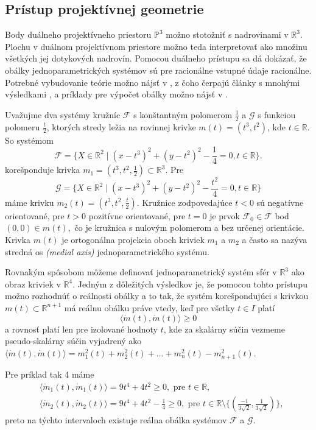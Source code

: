 \subsection{Prístup projektívnej geometrie}
Body duálneho projektívneho priestoru $\mathbb{P}^3 $ možno stotožniť s nadrovinami v $\mathbb{R}^3$. Plochu v duálnom projektívnom priestore možno teda interpretovať ako množinu všetkých jej dotykových nadrovín. Pomocou duálneho prístupu sa dá dokázať, že obálky jednoparametrických systémov sú pre racionálne vstupné údaje racionálne. Potrebné vybudovanie teórie možno nájsť v \cite{Pott01}, z čoho čerpajú články s mnohými výsledkami \cite{Pet08}, \cite{Pet98} a príklady pre výpočet obálky možno nájsť v \cite{Vra22}.
\begin{example}
Uvažujme dva systémy kružníc $\mathcal{F}$ s konštantným polomerom $\frac{1}{2}$ a $\mathcal{G}$ s funkciou polomeru $\frac{t}{2}$, ktorých stredy ležia na rovinnej krivke $m(t) = (t^3, t^2)$, kde $t \in \mathbb{R}.$
So systémom
$$ \mathcal{F} = \{ X \in \mathbb{R}^2 \mid (x - t^3)^2 + (y - t^2)^2 - \frac{1}{4} = 0, t \in \mathbb{R} \}.$$
korešponduje krivka $m_1 = (t^3, t^2, \frac{1}{2})\subset \mathbb{R}^3$.
Pre
$$ \mathcal{G} = \{ X \in \mathbb{R}^2 \mid (x - t^3)^2 + (y - t^2)^2 - \frac{t^2}{4} = 0, t \in \mathbb{R} \}$$
máme krivku $m_2(t) = (t^3, t^2, \frac{t}{2}).$
Kružnice zodpovedajúce $t < 0$ sú negatívne orientované, pre $t > 0$ pozitívne orientované, pre $t = 0$ je prvok $\mathcal{F}_0 \in \mathcal{F}$ bod $ (0, 0) \in m(t), $ čo je kružnica s nulovým polomerom a bez určenej orientácie.
Krivka $m(t)$ je ortogonálna projekcia oboch kriviek $m_1$ a $m_2$ a často sa nazýva stredná os \textit{(medial axis)} jednoparametrického systému.
\end{example}

Rovnakým spôsobom môžeme definovať jednoparametrický systém sfér v $\mathbb{R}^3$ ako obraz kriviek v $\mathbb{R}^4$.
Jedným z dôležitých výsledkov je, že pomocou tohto prístupu možno rozhodnúť o reálnosti obálky a to tak, že systém korešpondujúci s krivkou $m(t) \subset \mathbb{R}^{n+1}$ má reálnu obálku práve vtedy, keď pre všetky $t \in I $ platí 
$$\langle \dot{m}(t), \dot{m}(t) \rangle \geq 0$$ 
a rovnosť platí len pre izolované hodnoty $t$, kde za skalárny súčin vezmeme pseudo-skalárny súčin vyjadrený ako $\langle \dot{m}(t), \dot{m}(t) \rangle = m_1^2(t) + m_2^2(t) + \ldots + m_n^2(t) - m_{n+1}^2(t).$

Pre príklad tak 4 máme
\begin{align*}
&\langle \dot{m}_1(t), \dot{m}_1(t) \rangle = 9t^4 + 4t^2 \geq 0, \text{ pre } t \in \mathbb{R}, \\
&\langle \dot{m}_2(t), \dot{m}_2(t) \rangle = 9t^4 + 4t^2 - \frac{1}{4} \geq 0, \text{ pre } t \in \mathbb{R} \setminus \{ (\frac{-1}{3 \sqrt{2}}, \frac{1}{3 \sqrt{2}}) \},
\end{align*}
preto na týchto intervaloch existuje reálna obálka systémov $\mathcal{F}$ a $\mathcal{G}$.

